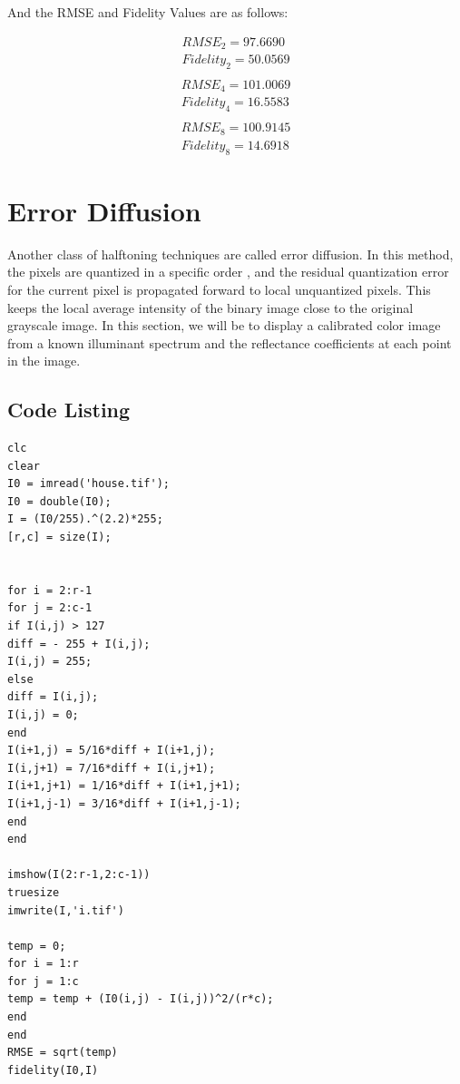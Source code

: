 \documentclass[paper=a4, fontsize=11pt]{scrartcl} %
\numberwithin{equation}{section} %
\numberwithin{figure}{section} %
\numberwithin{table}{section} %
\begin{document}
And the RMSE and Fidelity Values are as follows:

\begin{equation}
\begin{split}
RMSE_{2} = 97.6690\\
Fidelity_2 =    50.0569\\
\end{split}
\end{equation}
\begin{equation}
\begin{split}
RMSE_4 = 101.0069\\
Fidelity_4 =     16.5583\\
\end{split}
\end{equation}
\begin{equation}
\begin{split}
RMSE_8 = 100.9145\\
Fidelity_8 =   14.6918
\end{split}
\end{equation}

\section{Error Diffusion
}

Another class of halftoning techniques are called error diffusion. In this method, the pixels
are quantized in a specific order , and the residual
quantization error for the current pixel is propagated forward to local unquantized
pixels. This keeps the local average intensity of the binary image close to the original
grayscale image.
In this section, we will be to display a calibrated color image from a known illuminant
spectrum and the reflectance coefficients at each point in the image.

\subsection{Code Listing}

\begin{lstlisting}[frame=single]
clc
clear
I0 = imread('house.tif');
I0 = double(I0);
I = (I0/255).^(2.2)*255;
[r,c] = size(I);


for i = 2:r-1
for j = 2:c-1
if I(i,j) > 127
diff = - 255 + I(i,j);
I(i,j) = 255;
else
diff = I(i,j);
I(i,j) = 0;
end
I(i+1,j) = 5/16*diff + I(i+1,j);
I(i,j+1) = 7/16*diff + I(i,j+1);
I(i+1,j+1) = 1/16*diff + I(i+1,j+1);
I(i+1,j-1) = 3/16*diff + I(i+1,j-1);
end
end

imshow(I(2:r-1,2:c-1))
truesize
imwrite(I,'i.tif')

temp = 0;
for i = 1:r
for j = 1:c
temp = temp + (I0(i,j) - I(i,j))^2/(r*c);
end
end
RMSE = sqrt(temp)
fidelity(I0,I)

\end{lstlisting}
\end{document}
